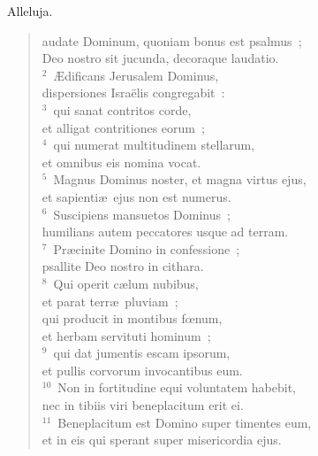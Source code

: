 \bchapter[Psalm]
Alleluja. \begin{verse}audate Dominum, quoniam bonus est psalmus~;\\ Deo nostro sit jucunda, decoraque laudatio.\\
${}^{2}$~\AE dificans Jerusalem Dominus,\\ dispersiones Isra\"elis congregabit~:\\
${}^{3}$~qui sanat contritos corde,\\ et alligat contritiones eorum~;\\
${}^{4}$~qui numerat multitudinem stellarum,\\ et omnibus eis nomina vocat.\\
${}^{5}$~Magnus Dominus noster, et magna virtus ejus,\\ et sapienti\ae\ ejus non est numerus.\\
${}^{6}$~Suscipiens mansuetos Dominus~;\\ humilians autem peccatores usque ad terram.\\
${}^{7}$~Pr\ae cinite Domino in confessione~;\\ psallite Deo nostro in cithara.\\
${}^{8}$~Qui operit c\ae lum nubibus,\\ et parat terr\ae\ pluviam~;\\ qui producit in montibus fœnum,\\ et herbam servituti hominum~;\\
${}^{9}$~qui dat jumentis escam ipsorum,\\ et pullis corvorum invocantibus eum.\\
${}^{10}$~Non in fortitudine equi voluntatem habebit,\\ nec in tibiis viri beneplacitum erit ei.\\
${}^{11}$~Beneplacitum est Domino super timentes eum,\\ et in eis qui sperant super misericordia ejus.\end{verse}



